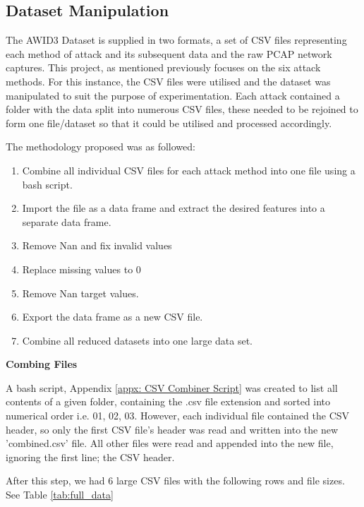 \subsection{Dataset Manipulation}

The AWID3 Dataset \parencite{9360747} is supplied in two formats, a set of CSV files representing each method of attack and its subsequent data and the raw PCAP network captures. This project, as mentioned previously focuses on the six attack methods. For this instance, the CSV files were utilised and the dataset was manipulated to suit the purpose of experimentation. Each attack contained a folder with the data split into numerous CSV files, these needed to be rejoined to form one file/dataset so that it could be utilised and processed accordingly. 

\medskip
The methodology proposed was as followed:
\begin{enumerate}
    \item Combine all individual CSV files for each attack method into one file using a bash script.
    \item Import the file as a data frame and extract the desired features into a separate data frame.
    \item Remove Nan and fix invalid values
    \item Replace missing values to 0
    \item Remove Nan target values.
    \item Export the data frame as a new CSV file.
    \item Combine all reduced datasets into one large data set.
\end{enumerate}

\medskip

\textbf{Combing Files}

\smallskip
A bash script, Appendix \ref{appx: CSV Combiner Script} was created to list all contents of a given folder, containing the .csv file extension and sorted into numerical order i.e. 01, 02, 03. However, each individual file contained the CSV header, so only the first CSV file's header was read and written into the new 'combined.csv' file. All other files were read and appended into the new file, ignoring the first line; the CSV header. 

After this step, we had 6 large CSV files with the following rows and file sizes. See Table \ref{tab:full_data}

